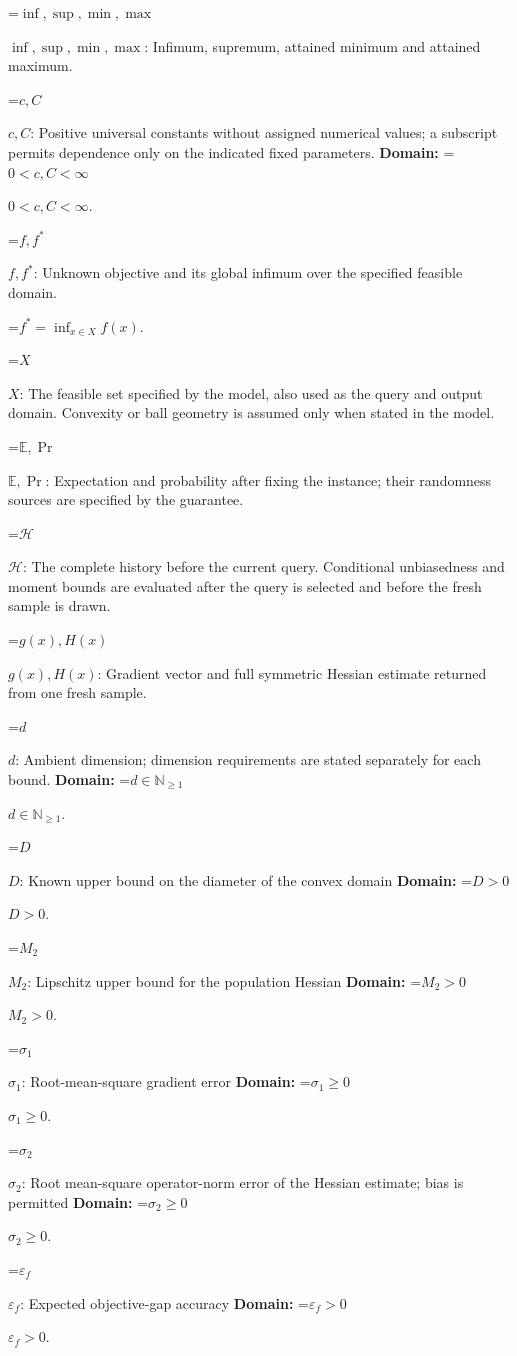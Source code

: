 \documentclass[10pt,a4paper]{article}
\newcommand{\AtlasMath}[1]{\par\begingroup\centering\setbox0=\hbox{$\displaystyle #1$}\ifdim\wd0>1.4\linewidth\typeout{ATLAS WIDE FORMULA: \the\wd0}\fi\ifdim\wd0>\linewidth\resizebox{\linewidth}{!}{\box0}\else\box0\fi\par\endgroup}
\newcommand{\AtlasInlineMath}[1]{\begingroup\setbox0=\hbox{$#1$}\ifdim\wd0>.4\linewidth\endgroup\AtlasMath{#1}\else\endgroup$#1$\fi}
\begin{document}
\AtlasInlineMath{\inf,\sup,\min,\max}: Infimum, supremum, attained minimum and attained maximum.

\AtlasInlineMath{c,C}: Positive universal constants without assigned numerical values; a subscript permits dependence only on the indicated fixed parameters. \textbf{Domain:} \AtlasInlineMath{0<c,C<\infty}.

\AtlasInlineMath{f,f^*}: Unknown objective and its global infimum over the specified feasible domain.


\AtlasMath{f^*=\inf_{x\in X}f(x).}


\AtlasInlineMath{X}: The feasible set specified by the model, also used as the query and output domain. Convexity or ball geometry is assumed only when stated in the model.

\AtlasInlineMath{\mathbb{E},\Pr}: Expectation and probability after fixing the instance; their randomness sources are specified by the guarantee.

\AtlasInlineMath{\mathcal{H}}: The complete history before the current query. Conditional unbiasedness and moment bounds are evaluated after the query is selected and before the fresh sample is drawn.

\AtlasInlineMath{g(x),H(x)}: Gradient vector and full symmetric Hessian estimate returned from one fresh sample.

\AtlasInlineMath{d}: Ambient dimension; dimension requirements are stated separately for each bound. \textbf{Domain:} \AtlasInlineMath{d\in\mathbb{N}_{\ge 1}}.

\AtlasInlineMath{D}: Known upper bound on the diameter of the convex domain \textbf{Domain:} \AtlasInlineMath{D>0}.

\AtlasInlineMath{M_2}: Lipschitz upper bound for the population Hessian \textbf{Domain:} \AtlasInlineMath{M_2>0}.

\AtlasInlineMath{\sigma_1}: Root-mean-square gradient error \textbf{Domain:} \AtlasInlineMath{\sigma_1\ge0}.

\AtlasInlineMath{\sigma_2}: Root mean-square operator-norm error of the Hessian estimate; bias is permitted \textbf{Domain:} \AtlasInlineMath{\sigma_2\ge0}.

\AtlasInlineMath{\varepsilon_f}: Expected objective-gap accuracy \textbf{Domain:} \AtlasInlineMath{\varepsilon_f>0}.
\end{document}
